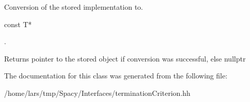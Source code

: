 Conversion of the stored implementation to. 


\begin{DoxyCode}
\textcolor{keyword}{const} T* 
\end{DoxyCode}
. \begin{DoxyReturn}{Returns}
pointer to the stored object if conversion was successful, else nullptr 
\end{DoxyReturn}


The documentation for this class was generated from the following file\+:\begin{DoxyCompactItemize}
\item 
/home/lars/tmp/\+Spacy/\+Interfaces/termination\+Criterion.\+hh\end{DoxyCompactItemize}
